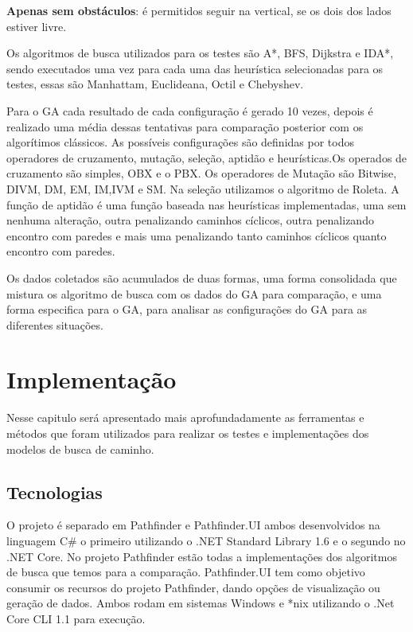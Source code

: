 \textbf{Apenas sem obstáculos}: é permitidos seguir na vertical, se os dois dos lados estiver livre.

\begin{minipage}{\linewidth}
    \label{fig:d_noobstacle}
\end{minipage}


Os algoritmos de busca utilizados para os testes são A\**, BFS, Dijkstra e IDA\**, sendo executados uma vez para cada uma das heurística selecionadas para os testes, essas são Manhattam, Euclideana, Octil e Chebyshev.

Para o GA cada resultado de cada configuração é gerado 10 vezes, depois é realizado uma média dessas tentativas para comparação posterior com os algorítimos clássicos. As possíveis configurações são definidas por todos operadores de cruzamento, mutação, seleção, aptidão e heurísticas.Os operados de cruzamento são simples, OBX e o PBX. Os operadores de Mutação são Bitwise, DIVM, DM, EM, IM,IVM e SM. Na seleção utilizamos o algoritmo de Roleta. A função de aptidão é uma função baseada nas heurísticas implementadas, uma sem nenhuma alteração, outra penalizando caminhos cíclicos, outra penalizando encontro com paredes e mais uma penalizando tanto caminhos cíclicos quanto encontro com paredes.

Os dados coletados são acumulados de duas formas, uma forma consolidada que mistura os algoritmo de busca com os dados do GA para comparação, e uma forma especifica para o GA, para analisar as configurações do GA para as diferentes situações.

\chapter[Implementação]{Implementação}

Nesse capitulo será apresentado mais aprofundadamente as ferramentas e métodos que foram utilizados para realizar os testes  e implementações dos modelos de busca de caminho.

\section{Tecnologias}
O projeto é separado em Pathfinder e Pathfinder.UI ambos desenvolvidos na linguagem C\# o primeiro utilizando o .NET Standard Library 1.6 e o segundo no .NET Core. No projeto Pathfinder estão todas a  implementações dos algoritmos de busca que temos para a comparação. Pathfinder.UI tem como objetivo consumir os recursos do projeto Pathfinder, dando opções de visualização ou geração de dados. Ambos rodam em sistemas Windows e \**nix utilizando o .Net Core CLI 1.1 para execução.

